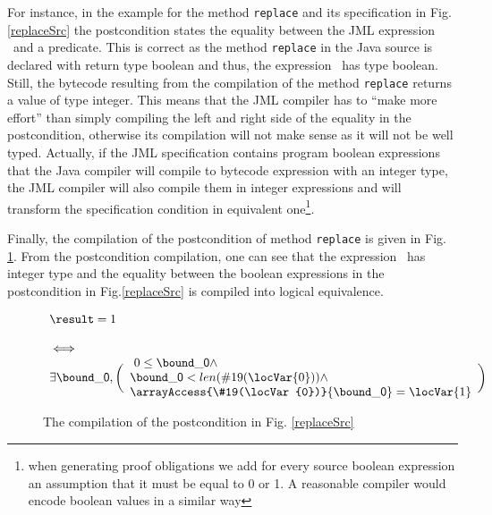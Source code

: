 \begin{enumerate}
 For instance, in the example for the method 
\texttt{replace} and its specification in Fig.\ref{replaceSrc} the postcondition states the equality between the JML expression  
\result \ and a predicate. This is correct as the method \texttt{replace} in the Java source is declared with return type boolean  and thus,
 the expression \result \ has type boolean. 
Still, the bytecode resulting from the compilation of the method  \texttt{replace} returns a value of type integer. This means that the JML compiler has to 
``make more effort'' than simply compiling the left and right side of the equality in the postcondition, otherwise its compilation will not make sense as 
it will not be well typed. Actually, if the JML specification contains program boolean expressions that the Java compiler will compile to bytecode expression
 with an integer type, the JML compiler will also compile them in integer expressions and will transform the specification condition in equivalent 
one\footnote{when generating proof obligations we add for every source boolean expression an assumption that it
 must be equal to 0 or 1. A reasonable compiler would encode boolean values in a similar way}.  

Finally, the compilation of the postcondition of method \texttt{replace} is given in Fig. \ref{postCompile}. From the postcondition compilation,
 one can see that the expression \result \ has integer type and the equality between the boolean expressions in the postcondition in Fig.\ref{replaceSrc} is
 compiled into logical equivalence. 

\begin{figure}[t]
\begin{frameit}
 $$\begin{array}{l}
         \result = 1 \\
          \\ 
         \iff \\ 
         \exists    \bound\_{\mbox{\rm \textsf{0}}}, 
           \biggl(\begin{array}{l} \ 0 \leq  \bound\_{\mbox{\rm \textsf{0}}} \wedge\\ 
             \bound\_{\mbox{\rm \textsf{0}}} < len(\#19(\locVar{0})) \wedge \\
             \arrayAccess{\#19(\locVar{0})}{\bound\_{\mbox{\rm \textsf{0}}} } = \locVar{1} 
         \end{array} \biggr) 
   \end{array}
$$
\caption{\sc The compilation of the postcondition in Fig. \ref{replaceSrc}}
\label{postCompile}
\end{frameit}
\end{figure}






\end{enumerate}
